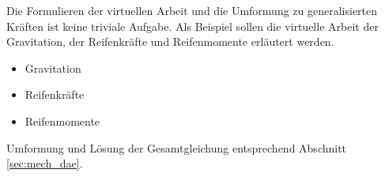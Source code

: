 Die Formulieren der virtuellen Arbeit und die Umformung zu generalisierten Kr\"aften ist keine triviale Aufgabe. Als Beispiel sollen die virtuelle Arbeit der Gravitation, der Reifenkr\"afte und Reifenmomente erl\"autert werden.  \cite[S.14 f.]{Cossalter2002}

\begin{itemize}
\item Gravitation
\item Reifenkr\"afte
\item Reifenmomente
\end{itemize}

Umformung und L\"osung der Gesamtgleichung entsprechend Abschnitt \ref{sec:mech_dae}.